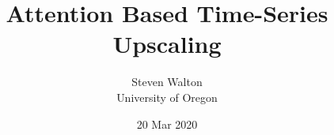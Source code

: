 \documentclass[pdf,11pt]{beamer}
\title{Attention Based Time-Series Upscaling
}
\author{Steven Walton\\ \small University of Oregon}
\date{20 Mar 2020}
\begin{document}
\frame{\titlepage}





\end{document}
